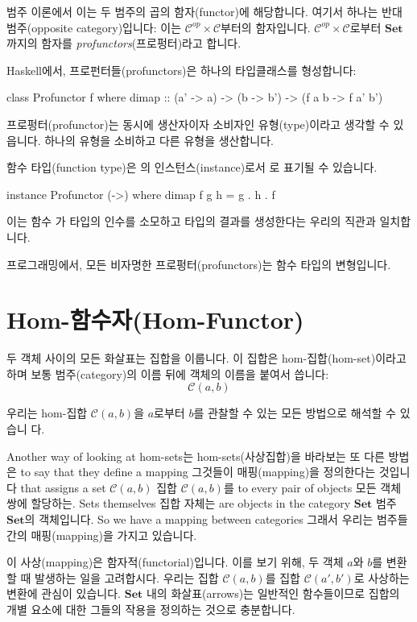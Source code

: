\documentclass[DaoFP]{subfiles}
\begin{document}
범주 이론에서 이는 두 범주의 곱의 함자(functor)에 해당합니다. 여기서 하나는 반대 범주(opposite category)입니다: 이는 $\mathcal{C}^{op} \times \mathcal{C}$부터의 함자입니다. $\mathcal{C}^{op} \times \mathcal{C}$로부터 $\mathbf{Set}$까지의 함자를 \emph{profunctors}(프로펑터)라고 합니다.

Haskell에서, 프로펀터들(profunctors)은 하나의 타입클래스를 형성합니다:
\begin{haskell}
class Profunctor f where
  dimap :: (a' -> a) -> (b -> b') -> (f a b -> f a' b')
\end{haskell}

프로펑터(profunctor)는 동시에 생산자이자 소비자인 유형(type)이라고 생각할 수 있읍니다. 하나의 유형을 소비하고 다른 유형을 생산합니다.

함수 타입(function type)은 의 인스턴스(instance)로서 \hask{(->)}로 표기될 수 있습니다.
\begin{haskell}
instance Profunctor (->) where
  dimap f g h = g . h . f
\end{haskell}
이는 함수 가  타입의 인수를 소모하고  타입의 결과를 생성한다는 우리의 직관과 일치합니다.

프로그래밍에서, 모든 비자명한 프로펑터(profunctors)는 함수 타입의 변형입니다.

\section{Hom-함수자(Hom-Functor)}

두 객체 사이의 모든 화살표는 집합을 이룹니다. 이 집합은 hom-집합(hom-set)이라고 하며 보통 범주(category)의 이름 뒤에 객체의 이름을 붙여서 씁니다:
\[ \mathcal{C}(a, b) \]

우리는 hom-집합 $\mathcal{C}(a, b)$을 $a$로부터 $b$를 관찰할 수 있는 모든 방법으로 해석할 수 있습니 다.

Another way of looking at hom-sets는 hom-sets(사상집합)을 바라보는 또 다른 방법은 to say that they define a mapping 그것들이 매핑(mapping)을 정의한다는 것입니다 that assigns a set $\mathcal{C}(a, b)$ 집합 $\mathcal{C}(a, b)$를 to every pair of objects 모든 객체 쌍에 할당하는. Sets themselves 집합 자체는 are objects in the category $\mathbf{Set}$ 범주 $\mathbf{Set}$의 객체입니다. So we have a mapping between categories 그래서 우리는 범주들 간의 매핑(mapping)을 가지고 있습니다.

이 사상(mapping)은 함자적(functorial)입니다. 이를 보기 위해, 두 객체 $a$와 $b$를 변환할 때 발생하는 일을 고려합시다. 우리는 집합 $\mathcal{C}(a, b)$를 집합 $\mathcal{C}(a', b')$로 사상하는 변환에 관심이 있습니다. $\mathbf{Set}$ 내의 화살표(arrows)는 일반적인 함수들이므로 집합의 개별 요소에 대한 그들의 작용을 정의하는 것으로 충분합니다.
\end{document}
